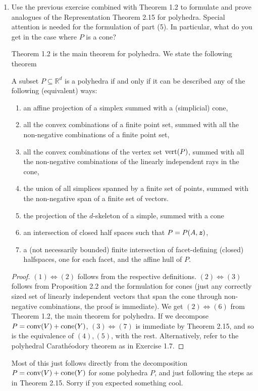 \documentclass{article}
\begin{document}
\begin{enumerate}
\begin{proof}
\end{proof}

\item Use the previous exercise combined with Theorem 1.2 to formulate and prove analogues of the Representation Theorem 2.15 for polyhedra. Special attention is needed for the formulation of part (5). In particular, what do you get in the case where $P$ is a cone?

\begin{solution}
Theorem 1.2 is the main theorem for polyhedra. We state the following theorem

\begin{theorem*}
A subset $P \subseteq \mathbb{R}^d$ is a polyhedra if and only if it can be described any of the following (equivalent) ways:

\begin{enumerate}[label=(\arabic*)]
    \item an affine projection of a simplex summed with a (simplicial) cone,
    \item all the convex combinations of a finite point set, summed with all the non-negative combinations of a finite point set,
    \item all the convex combinations of the vertex set $\textup{vert}(P)$, summed with all the non-negative combinations of the linearly independent rays in the cone,
    \item the union of all simplices spanned by a finite set of points, summed with the non-negative span of a finite set of vectors.
    \item the projection of the $d$-skeleton of a simple, summed with a cone
    \item an intersection of closed half spaces such that $P = P(A, \textbf{\textit{z}})$,
    \item a (not necessarily bounded) finite intersection of facet-defining (closed) halfspaces, one for each facet, and the affine hull of $P$.
\end{enumerate}
\end{theorem*}
\begin{proof}
   $(1) \iff (2)$ follows from the respective definitions. $(2) \iff (3)$ follows from Proposition 2.2 and the formulation for cones (just any correctly sized set of linearly independent vectors that span the cone through non-negative combinations, the proof is immediate). We get $(2) \iff (6)$ from Theorem 1.2, the main theorem for polyhedra. If we decompose $P = \operatorname{conv}(V) + \operatorname{cone}(Y)$, $(3) \iff (7)$ is immediate by Theorem 2.15, and so is the equivalence of $(4), (5)$, with the rest. Alternatively, refer to the polyhedral Carathéodory theorem as in Exercise 1.7. 
\end{proof}
\begin{remark}
    Most of this just follows directly from the decomposition $P = \operatorname{conv}(V) + \operatorname{cone}(Y)$ for some polyhedra $P$, and just following the steps as in Theorem 2.15. Sorry if you expected something cool.
\end{remark}
\end{solution}


\end{enumerate}
\end{document}
